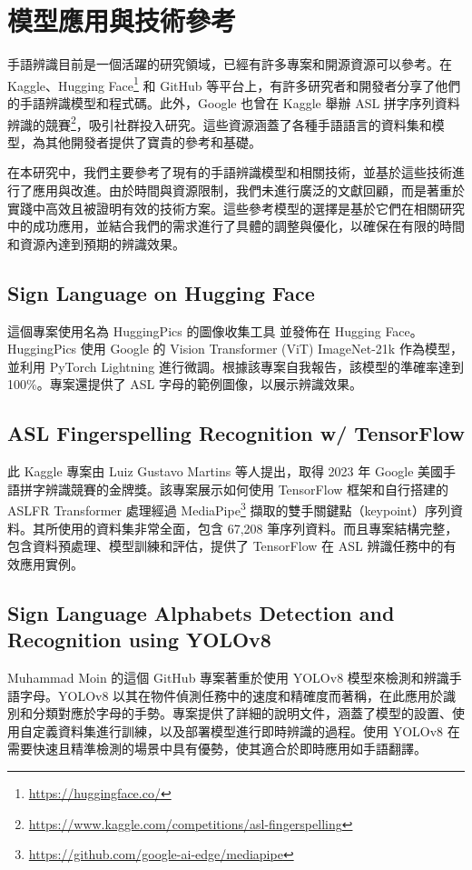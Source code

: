 \documentclass[conference]{IEEEtran}
\begin{document}
\section{模型應用與技術參考}

手語辨識目前是一個活躍的研究領域，已經有許多專案和開源資源可以參考。在 Kaggle、Hugging Face\footnote{\url{https://huggingface.co/}} 和 GitHub 等平台上，有許多研究者和開發者分享了他們的手語辨識模型和程式碼。此外，Google 也曾在 Kaggle 舉辦 ASL 拼字序列資料辨識的競賽\footnote{\url{https://www.kaggle.com/competitions/asl-fingerspelling}}，吸引社群投入研究。這些資源涵蓋了各種手語語言的資料集和模型，為其他開發者提供了寶貴的參考和基礎。

在本研究中，我們主要參考了現有的手語辨識模型和相關技術，並基於這些技術進行了應用與改進。由於時間與資源限制，我們未進行廣泛的文獻回顧，而是著重於實踐中高效且被證明有效的技術方案。這些參考模型的選擇是基於它們在相關研究中的成功應用，並結合我們的需求進行了具體的調整與優化，以確保在有限的時間和資源內達到預期的辨識效果。

\subsection{Sign Language on Hugging Face}
這個專案使用名為 HuggingPics 的圖像收集工具 \cite{ravenonur2024sign, nate2021hugging} 並發佈在 Hugging Face。HuggingPics 使用 Google 的 Vision Transformer (ViT) ImageNet-21k 作為模型，並利用 PyTorch Lightning 進行微調。根據該專案自我報告，該模型的準確率達到 100\%。專案還提供了 ASL 字母的範例圖像，以展示辨識效果。

\subsection{ASL Fingerspelling Recognition w/ TensorFlow}
此 Kaggle 專案由 Luiz Gustavo Martins 等人提出，取得 2023 年 Google 美國手語拼字辨識競賽的金牌獎。該專案展示如何使用 TensorFlow 框架和自行搭建的 ASLFR Transformer 處理經過 MediaPipe\footnote{\url{https://github.com/google-ai-edge/mediapipe}} 擷取的雙手關鍵點（keypoint）序列資料\cite{gusthema2024asl}。其所使用的資料集非常全面，包含 67,208 筆序列資料。而且專案結構完整，包含資料預處理、模型訓練和評估，提供了 TensorFlow 在 ASL 辨識任務中的有效應用實例。

\subsection{Sign Language Alphabets Detection and Recognition using YOLOv8}
Muhammad Moin 的這個 GitHub 專案著重於使用 YOLOv8 模型來檢測和辨識手語字母\cite{muhammadmoinfaisal2024sign}。YOLOv8 以其在物件偵測任務中的速度和精確度而著稱，在此應用於識別和分類對應於字母的手勢。專案提供了詳細的說明文件，涵蓋了模型的設置、使用自定義資料集進行訓練，以及部署模型進行即時辨識的過程。使用 YOLOv8 在需要快速且精準檢測的場景中具有優勢，使其適合於即時應用如手語翻譯。
\end{document}
